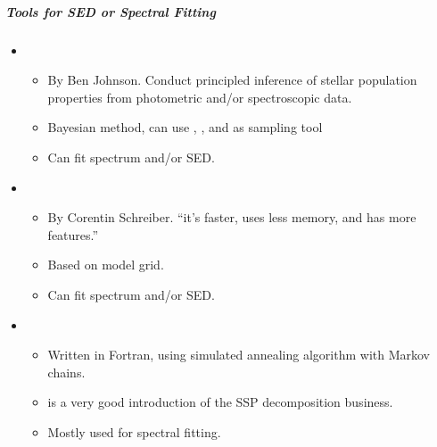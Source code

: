 \documentclass[letterpaper,10pt,english]{sphinxmanual}
\begin{document}
\subparagraph{Tools for SED or Spectral Fitting}
\label{\detokenize{resource/astro/topics/stellar_and_spops:tools-for-sed-or-spectral-fitting}}\begin{itemize}
\item {} 
\begin{itemize}
\item {} 
By Ben Johnson. Conduct principled inference of stellar population
properties from photometric and/or spectroscopic data.

\item {} 
Bayesian method, can use , , and  as
sampling tool

\item {} 
Can fit spectrum and/or SED.

\end{itemize}

\item {} 
\begin{itemize}
\item {} 
By Corentin Schreiber. “it’s faster, uses less memory, and has
more features.”

\item {} 
Based on model grid.

\item {} 
Can fit spectrum and/or SED.

\end{itemize}

\item {} 
\begin{itemize}
\item {} 
Written in Fortran, using simulated annealing algorithm with
Markov chains.

\item {} 
is a very good introduction of the SSP decomposition business.

\item {} 
Mostly used for spectral fitting.

\end{itemize}


\end{itemize}
\end{document}
